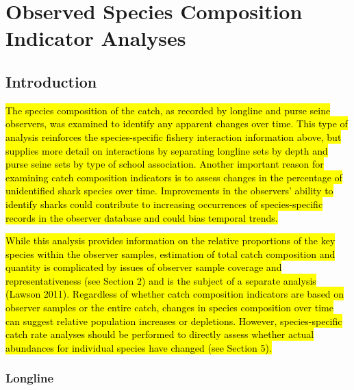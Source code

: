 \documentclass[12pt]{SCreport}
\begin{document}
      
      
\section{Observed Species Composition Indicator Analyses}
 \subsection{Introduction}
\hl{The species composition of the catch, as recorded by longline and purse seine observers, was examined to identify any apparent changes over time. This type of analysis reinforces the species-specific fishery interaction information above, but supplies more detail on interactions by separating longline sets by depth and purse seine sets by type of school association. Another important reason for examining catch composition indicators is to assess changes in the percentage of unidentified shark species over time. Improvements in the observers' ability to identify sharks could contribute to increasing occurrences of species-specific records in the observer database and could bias temporal trends.}

\hl{While this analysis provides information on the relative proportions of the key species within the observer samples, estimation of total catch composition and quantity is complicated by issues of observer sample coverage and representativeness (see Section 2) and is the subject of a separate analysis (Lawson 2011). Regardless of whether catch composition indicators are based on observer samples or the entire catch, changes in species composition over time can suggest relative population increases or depletions. However, species-specific catch rate analyses should be performed to directly assess whether actual abundances for individual species have changed (see Section 5).}
     
      
  \subsubsection*{Longline}  
  
\end{document}
